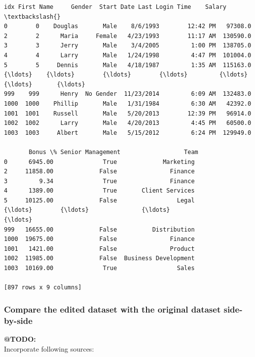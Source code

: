 \documentclass [oneside,10pt,a4paper,ngerman,BCOR10mm,headsepline,parindent,final]{scrartcl}
\makeatletter
\newcommand{\boxspacing}{\kern\kvtcb@left@rule\kern\kvtcb@boxsep}
\newcommand{\prompt}[4]{
        {\ttfamily\llap{{\color{#2}[#3]:\hspace{3pt}#4}}\vspace{-\baselineskip}}
    }
\makeatother
\begin{document}
            \begin{tcolorbox}[breakable, size=fbox, boxrule=.5pt, pad at break*=1mm, opacityfill=0]
\prompt{Out}{outcolor}{24}{\boxspacing}
\begin{Verbatim}[commandchars=\\\{\}]
       idx First Name     Gender  Start Date Last Login Time    Salary  \textbackslash{}
0        0    Douglas       Male    8/6/1993        12:42 PM   97308.0
2        2      Maria     Female   4/23/1993        11:17 AM  130590.0
3        3      Jerry       Male    3/4/2005         1:00 PM  138705.0
4        4      Larry       Male   1/24/1998         4:47 PM  101004.0
5        5     Dennis       Male   4/18/1987         1:35 AM  115163.0
{\ldots}    {\ldots}        {\ldots}        {\ldots}         {\ldots}             {\ldots}       {\ldots}
999    999      Henry  No Gender  11/23/2014         6:09 AM  132483.0
1000  1000    Phillip       Male   1/31/1984         6:30 AM   42392.0
1001  1001    Russell       Male   5/20/2013        12:39 PM   96914.0
1002  1002      Larry       Male   4/20/2013         4:45 PM   60500.0
1003  1003     Albert       Male   5/15/2012         6:24 PM  129949.0

       Bonus \% Senior Management                  Team
0      6945.00              True             Marketing
2     11858.00             False               Finance
3         9.34              True               Finance
4      1389.00              True       Client Services
5     10125.00             False                 Legal
{\ldots}        {\ldots}               {\ldots}                   {\ldots}
999   16655.00             False          Distribution
1000  19675.00             False               Finance
1001   1421.00             False               Product
1002  11985.00             False  Business Development
1003  10169.00              True                 Sales

[897 rows x 9 columns]
\end{Verbatim}
\end{tcolorbox}
        
    \hypertarget{compare-the-edited-dataset-with-the-original-dataset-side-by-side}{%
\subsubsection{Compare the edited dataset with the original dataset
side-by-side}\label{compare-the-edited-dataset-with-the-original-dataset-side-by-side}}

\textbf{@TODO:}\\
Incorporate following sources:
\end{document}
